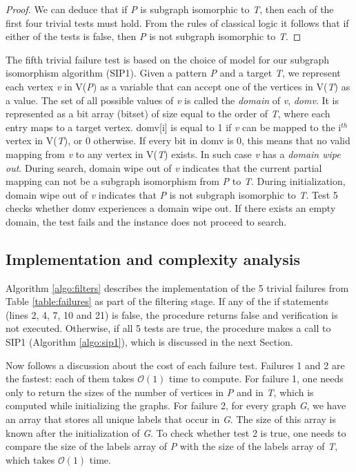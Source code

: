 \documentclass{l4proj}
\begin{document}
\begin{proof}
We can deduce that if \emph{P} is subgraph isomorphic to \emph{T}, then each of the first four trivial tests must hold. From the rules of classical logic it follows that if either of the tests is false, then \emph{P} is not subgraph isomorphic to \emph{T}.
\end{proof}

The fifth trivial failure test is based on the choice of model for our subgraph isomorphism algorithm (SIP1). Given a pattern \emph{P} and a target \emph{T}, we represent each vertex \emph{v} in V(\emph{P}) as a variable that can accept one of the vertices in V(\emph{T}) as a value. The set of all possible values of \emph{v} is called the \emph{domain} of \emph{v}, \emph{domv}. It is represented as a bit array (bitset) of size equal to the order of \emph{T}, where each entry maps to a target vertex. domv[i] is equal to 1 if \emph{v} can be mapped to the i$^{th}$ vertex in V(\emph{T}), or 0 otherwise. If every bit in domv is 0, this means that no valid mapping from \emph{v} to any vertex in V(\emph{T}) exists. In such case \emph{v} has a \emph{domain wipe out}. During search, domain wipe out of \emph{v} indicates that the current partial mapping can not be a subgraph isomorphism from \emph{P} to \emph{T}. During initialization, domain wipe out of \emph{v} indicates that \emph{P} is not subgraph isomorphic to \emph{T}. Test 5 checks whether domv experiences a domain wipe out. If there exists an empty domain, the test fails and the instance does not proceed to search.

\subsection{Implementation and complexity analysis}
\label{sec:trivialFailsImplementation}
Algorithm \ref{algo:filters} describes the implementation of the 5 trivial failures from Table \ref{table:failures} as part of the filtering stage. If any of the if statements (lines 2, 4, 7, 10 and 21) is false, the procedure returns false and verification is not executed. Otherwise, if all 5 tests are true, the procedure makes a call to SIP1 (Algorithm \ref{algo:sip1}), which is discussed in the next Section.

Now follows a discussion about the cost of each failure test.
Failures 1 and 2 are the fastest: each of them takes $\mathcal{O}(1)$ time to compute. For failure 1, one needs only to return the sizes of the number of vertices in \emph{P} and in \emph{T}, which is computed while initializing the graphs. For failure 2, for every graph \emph{G}, we have an array that stores all unique labels that occur in \emph{G}. The size of this array is known after the initialization of \emph{G}. To check whether test 2 is true, one needs to compare the size of the labels array of \emph{P} with the size of the labels array of \emph{T},  which takes $\mathcal{O}(1)$ time.
\end{document}
